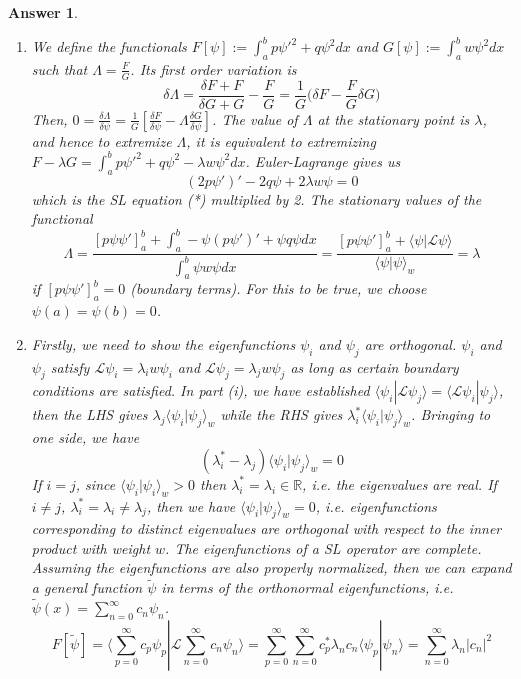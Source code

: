 \documentclass[a4paper]{article}
\newtheorem{ans}{Answer}[section]
\theoremstyle{new}
\begin{document}
\begin{ans}\leavevmode
\begin{enumerate}[label=(\roman*)]
\item We define the functionals $F[\psi]:=\int_a^bp\psi'^2+q\psi^2dx$ and $G[\psi]:=\int_a^bw\psi^2dx$ such that $\Lambda=\frac{F}{G}$. Its first order variation is 
$$\delta\Lambda=\frac{\delta F+F}{\delta G+G}-\frac{F}{G}=\frac{1}{G}\bigg(\delta F-\frac{F}{G}\delta G\bigg)$$
Then, $0=\frac{\delta\Lambda}{\delta\psi}=\frac{1}{G}[\frac{\delta F}{\delta\psi}-\Lambda\frac{\delta G}{\delta\psi}]$. The value of $\Lambda$ at the stationary point is $\lambda$, and hence to extremize $\Lambda$, it is equivalent to extremizing $F-\lambda G=\int_a^bp\psi'^2+q\psi^2-\lambda w\psi^2dx$. Euler-Lagrange gives us 
$$(2p\psi')'-2q\psi+2\lambda w\psi=0$$
which is the SL equation (*) multiplied by 2. The stationary values of the functional
$$\Lambda=\frac{[p\psi\psi']_a^b+\int_a^b-\psi(p\psi')'+\psi q\psi dx}{\int_a^b\psi w\psi dx}=\frac{[p\psi\psi']_a^b+\langle\psi|\mathcal{L}\psi\rangle}{\langle\psi|\psi\rangle_w}=\lambda$$
if $[p\psi\psi']_a^b=0$ (boundary terms). For this to be true, we choose $\psi(a)=\psi(b)=0$.\item Firstly, we need to show the eigenfunctions $\psi_i$ and $\psi_j$ are orthogonal. $\psi_i$ and $\psi_j$ satisfy $\mathcal{L}\psi_i=\lambda_iw\psi_i$ and $\mathcal{L}\psi_j=\lambda_jw\psi_j$ as long as certain boundary conditions are satisfied. In part (i), we have established $\langle\psi_i|\mathcal{L}\psi_j\rangle=\langle\mathcal{L}\psi_i|\psi_j\rangle$, then the LHS gives $\lambda_j\langle\psi_i|\psi_j\rangle_w$ while the RHS gives $\lambda_i^*\langle\psi_i|\psi_j\rangle_w$. Bringing to one side, we have
$$(\lambda_i^*-\lambda_j)\langle\psi_i|\psi_j\rangle_w=0$$
If $i=j$, since $\langle\psi_i|\psi_i\rangle_w>0$ then $\lambda_i^*=\lambda_i\in\mathbb{R}$, i.e. the eigenvalues are real. If $i\neq j$, $\lambda_i^*=\lambda_i\neq\lambda_j$, then we have $\langle\psi_i|\psi_j\rangle_w=0$, i.e. eigenfunctions corresponding to distinct eigenvalues are orthogonal with respect to the inner product with weight $w$. The eigenfunctions of a SL operator are complete. Assuming the eigenfunctions are also properly normalized, then we can expand a general function $\tilde{\psi}$ in terms of the orthonormal eigenfunctions, i.e. $\tilde{\psi}(x)=\sum_{n=0}^\infty c_n\psi_n$.
$$F[\tilde{\psi}]=\bigg\langle\sum_{p=0}^\infty c_p\psi_p|\mathcal{L}\sum_{n=0}^\infty c_n\psi_n\bigg\rangle=\sum_{p=0}^\infty\sum_{n=0}^\infty c_p^*\lambda_nc_n\langle\psi_p|\psi_n\rangle=\sum_{n=0}^\infty\lambda_n|c_n|^2$$

\end{enumerate}
\end{ans}
\end{document}
